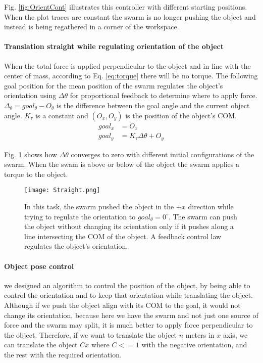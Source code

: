 Fig. \ref{fig:OrientCont} illustrates this controller with different starting positions. When the plot traces are constant the swarm is no longer pushing the object and instead is being regathered in a corner of the workspace. 

\paragraph{Translation straight while regulating orientation of the object} \label{para:PureTranslation}

When the total force is applied perpendicular to the object and in line with the center of mass, according to Eq. \ref{eq:torque} there will be no torque. 
The following goal position for the mean position of the swarm regulates the object's orientation using $\Delta \theta$ for proportional feedback  to determine where to apply force.
$\Delta_\theta = goal_\theta - O_\theta$ is the difference between the goal angle and the current object angle.
 $K_\tau$ is a constant and $(O_x,O_y)$ is the position of the object's COM.
\begin{align}
goal_x &= O_x \nonumber \\
goal_y &= K_\tau \Delta\theta + O_y
\end{align}

 Fig. \ref{fig:Straight} shows how $\Delta \theta$ converges to zero with different initial configurations of the swarm. When the swam is above or below of the object the swarm applies a torque to the object.
 
 
\begin{figure}
\begin{center}
	\texttt{[image: Straight.png]}
\end{center}
\vspace{-1em}
\caption{\label{fig:Straight}
In this task, the swarm pushed the object in the $+x$ direction while trying to regulate the orientation to $goal_\theta = 0^\circ$.
 The swarm can push the object without changing its orientation only if it pushes along a line intersecting the COM of the object.  A feedback control law regulates the object's orientation.
}
\vspace{-1em}
\end{figure}

\paragraph{Object pose control}
we designed an algorithm to control the position of the object, by being able to control the orientation and to keep that orientation while translating the object. Although if we push the object align with its COM to the goal, it would not change its orientation, because here we have the swarm and not just one source of force and the swarm may split, it is much better to apply force perpendicular to the object. Therefore, if we want to translate the object $n$ meters in $x$ axis, we can translate the object $Cx$ where $C<=1$ with the negative orientation, and the rest with the required orientation.


